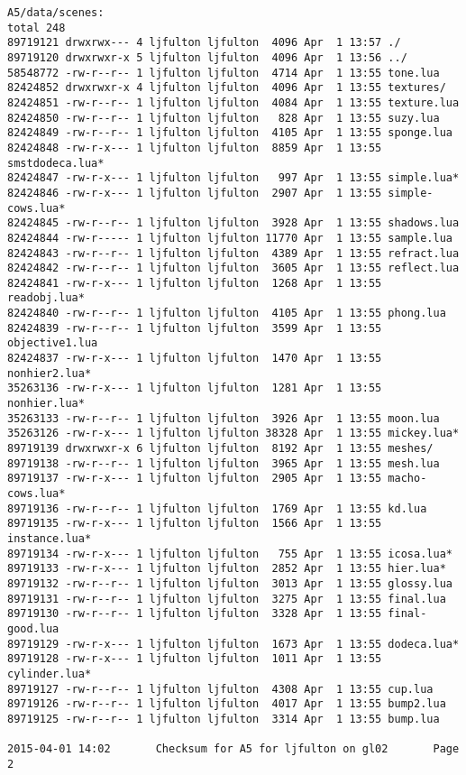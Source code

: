 \documentclass[12pt]{article}
\begin{document}
\begin{verbatim}
A5/data/scenes:
total 248
89719121 drwxrwx--- 4 ljfulton ljfulton  4096 Apr  1 13:57 ./
89719120 drwxrwxr-x 5 ljfulton ljfulton  4096 Apr  1 13:56 ../
58548772 -rw-r--r-- 1 ljfulton ljfulton  4714 Apr  1 13:55 tone.lua
82424852 drwxrwxr-x 4 ljfulton ljfulton  4096 Apr  1 13:55 textures/
82424851 -rw-r--r-- 1 ljfulton ljfulton  4084 Apr  1 13:55 texture.lua
82424850 -rw-r--r-- 1 ljfulton ljfulton   828 Apr  1 13:55 suzy.lua
82424849 -rw-r--r-- 1 ljfulton ljfulton  4105 Apr  1 13:55 sponge.lua
82424848 -rw-r-x--- 1 ljfulton ljfulton  8859 Apr  1 13:55 smstdodeca.lua*
82424847 -rw-r-x--- 1 ljfulton ljfulton   997 Apr  1 13:55 simple.lua*
82424846 -rw-r-x--- 1 ljfulton ljfulton  2907 Apr  1 13:55 simple-cows.lua*
82424845 -rw-r--r-- 1 ljfulton ljfulton  3928 Apr  1 13:55 shadows.lua
82424844 -rw-r----- 1 ljfulton ljfulton 11770 Apr  1 13:55 sample.lua
82424843 -rw-r--r-- 1 ljfulton ljfulton  4389 Apr  1 13:55 refract.lua
82424842 -rw-r--r-- 1 ljfulton ljfulton  3605 Apr  1 13:55 reflect.lua
82424841 -rw-r-x--- 1 ljfulton ljfulton  1268 Apr  1 13:55 readobj.lua*
82424840 -rw-r--r-- 1 ljfulton ljfulton  4105 Apr  1 13:55 phong.lua
82424839 -rw-r--r-- 1 ljfulton ljfulton  3599 Apr  1 13:55 objective1.lua
82424837 -rw-r-x--- 1 ljfulton ljfulton  1470 Apr  1 13:55 nonhier2.lua*
35263136 -rw-r-x--- 1 ljfulton ljfulton  1281 Apr  1 13:55 nonhier.lua*
35263133 -rw-r--r-- 1 ljfulton ljfulton  3926 Apr  1 13:55 moon.lua
35263126 -rw-r-x--- 1 ljfulton ljfulton 38328 Apr  1 13:55 mickey.lua*
89719139 drwxrwxr-x 6 ljfulton ljfulton  8192 Apr  1 13:55 meshes/
89719138 -rw-r--r-- 1 ljfulton ljfulton  3965 Apr  1 13:55 mesh.lua
89719137 -rw-r-x--- 1 ljfulton ljfulton  2905 Apr  1 13:55 macho-cows.lua*
89719136 -rw-r--r-- 1 ljfulton ljfulton  1769 Apr  1 13:55 kd.lua
89719135 -rw-r-x--- 1 ljfulton ljfulton  1566 Apr  1 13:55 instance.lua*
89719134 -rw-r-x--- 1 ljfulton ljfulton   755 Apr  1 13:55 icosa.lua*
89719133 -rw-r-x--- 1 ljfulton ljfulton  2852 Apr  1 13:55 hier.lua*
89719132 -rw-r--r-- 1 ljfulton ljfulton  3013 Apr  1 13:55 glossy.lua
89719131 -rw-r--r-- 1 ljfulton ljfulton  3275 Apr  1 13:55 final.lua
89719130 -rw-r--r-- 1 ljfulton ljfulton  3328 Apr  1 13:55 final-good.lua
89719129 -rw-r-x--- 1 ljfulton ljfulton  1673 Apr  1 13:55 dodeca.lua*
89719128 -rw-r-x--- 1 ljfulton ljfulton  1011 Apr  1 13:55 cylinder.lua*
89719127 -rw-r--r-- 1 ljfulton ljfulton  4308 Apr  1 13:55 cup.lua
89719126 -rw-r--r-- 1 ljfulton ljfulton  4017 Apr  1 13:55 bump2.lua
89719125 -rw-r--r-- 1 ljfulton ljfulton  3314 Apr  1 13:55 bump.lua

2015-04-01 14:02       Checksum for A5 for ljfulton on gl02       Page 2


\end{verbatim}
\end{document}
